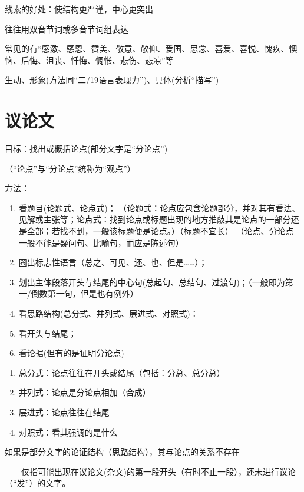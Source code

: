 线索的好处：使结构更严谨，中心更突出

  往往用双音节词或多音节词组表达

  常见的有``感激、感恩、赞美、敬意、敬仰、爱国、思念、喜爱、喜悦、愧疚、懊恼、后悔、沮丧、忏悔、惆怅、悲伤、悲凉''等

  生动、形象(方法同``二/19语言表现力'')、具体(分析``描写'')

\section{议论文}
目标：找出或概括论点(部分文字是``分论点'')

（``论点''与``分论点''统称为``观点''）

方法：\begin{enumerate}\item 看题目(论题式、论点式)；
        （论题式：论点应包含论题部分，并对其有看法、见解或主张等；论点式：找到论点或标题出现的地方推敲其是论点的一部分还是全部；若找不到，一般该标题便是论点。）（标题不宜长）
        （论点、分论点一般不能是疑问句、比喻句，而应是陈述句）
        \item 圈出标志性语言（总之、可见、还、也、但是\ldots{}\ldots{}）；
        \item 划出主体段落开头与结尾的中心句(总起句、总结句、过渡句)；（一般即为第一/倒数第一句，但是也有例外）
        \item 看思路结构(总分式、并列式、层进式、对照式)：
        \item 看开头与结尾；
        \item 看论据(但有的是证明分论点)
\end{enumerate}

\begin{enumerate}
\item 总分式：论点往往在开头或结尾（包括：分总、总分总）
\item 并列式：论点是分论点相加（合成）
\item 层进式：论点往往在结尾
\item 对照式：看其强调的是什么
\end{enumerate}

如果是部分文字的论证结构（思路结构），其与论点的关系不存在

——仅指可能出现在议论文(杂文)的第一段开头（有时不止一段），还未进行议论（``发''）的文字。

